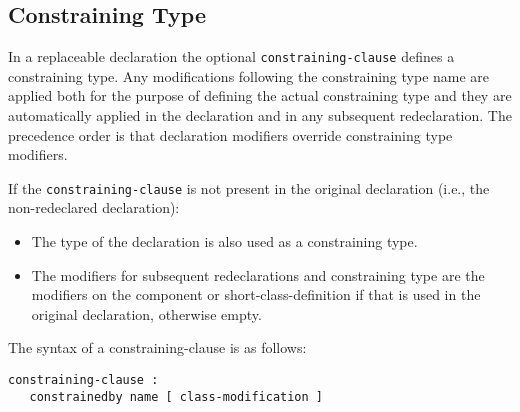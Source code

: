 \subsection{Constraining Type}\label{constraining-type}

In a replaceable declaration the optional \lstinline!constraining-clause! defines a
constraining type. Any modifications following the constraining type
name are applied both for the purpose of defining the actual
constraining type and they are automatically applied in the declaration
and in any subsequent redeclaration. The precedence order is that
declaration modifiers override constraining type modifiers.

If the \lstinline!constraining-clause! is not present in the original declaration
(i.e., the non-redeclared declaration):
\begin{itemize}
\item
  The type of the declaration is also used as a constraining type.
\item
  The modifiers for subsequent redeclarations and constraining type are
  the modifiers on the component or short-class-definition if that is
  used in the original declaration, otherwise empty.
\end{itemize}

The syntax of a constraining-clause is as follows:
\begin{lstlisting}[language=grammar]
constraining-clause :
   constrainedby name [ class-modification ]
\end{lstlisting}

